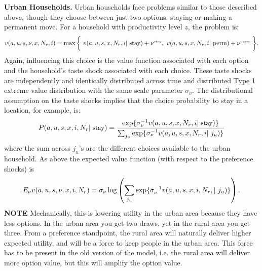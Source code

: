 \documentclass[pdftex,11pt]{article}
\begin{document}
\textbf{Urban Households.} Urban households face problems similar to those described above, though they choose between just two options: staying or making a permanent move. For a household with productivity level $z$, the problem is:
\begin{align}
v(a, u, s, \nu, x, N_r, i) = \max \bigg\{ \ v(a, u, s, x, N_r, i| \ \mbox{stay}) + \nu^{\tiny\mbox{stay}}, \  v(a, u, s, x, N_r,  i| \ \mbox{perm}) + \nu^{\tiny\mbox{perm}} \ \bigg \}.
\label{eq:bellman_urban}
\end{align}
Again, influencing this choice is the value function associated with each option and the household's taste shock associated with each choice. These taste shocks are independently and identically distributed across time and distributed Type 1 extreme value distribution with the same scale parameter $\sigma_{\nu}$. The distributional assumption on the taste shocks implies that the choice probability to stay in a location, for example, is:
\begin{eqnarray*}
\small
P(a, u, s, x, i, N_r| \ \mbox{stay}) = \frac{\exp\{\sigma_{\nu}^{-1} v(a, u, s, x, N_r, i| \ \mbox{stay})  \}}{\sum_{j_u} \exp\{\sigma_{\nu}^{-1} v(a, u, s, x, N_r, i| \ j_u)\}}
\end{eqnarray*}
where the sum across $j_u$'s are the different choices available to the urban household. As above the expected value function (with respect to the preference shocks) is
\begin{eqnarray*}
\small
E_{\nu} v(a, u, s, \nu, x, i, N_r) = \sigma_{\nu} \log \left( \sum_{j_u} \exp\{\sigma_{\nu}^{-1} v(a, u,  s, x, i, N_r, | \ j_u)\} \right).
\end{eqnarray*}
\textbf{NOTE} Mechanically, this is lowering utility in the urban area because they have less options. In the urban area you get two draws, yet in the rural area you get three. From a preference standpoint, the rural area will naturally deliver higher expected utility, and will be a force to keep people in the urban area. This force has to be present in the old version of the model, i.e. the rural area will deliver more option value, but this will amplify the option value.  
\end{document}
